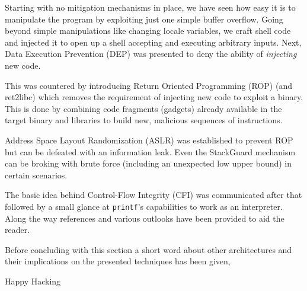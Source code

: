 \documentclass[article]{uibk}
\begin{document}
Starting with no mitigation mechanisms in place, we have seen how easy it is to
manipulate the program by exploiting just one simple buffer overflow. Going
beyond simple manipulations like changing locale variables, we craft shell code
and injected it to open up a shell accepting and executing arbitrary inputs.
Next, Data Execution Prevention (DEP) was presented to deny the ability of
\emph{injecting} new code.

This was countered by introducing Return Oriented Programming (ROP) (and
ret2libc) which removes the requirement of injecting new code to exploit a
binary. This is done by combining code fragments (gadgets) already available in
the target binary and libraries to build new, malicious sequences of
instructions.

Address Space Layout Randomization (ASLR) was established to prevent ROP but
can be defeated with an information leak. Even the StackGuard mechanism can be
broking with brute force (including an unexpected low upper bound) in certain
scenarios.

The basic idea behind Control-Flow Integrity (CFI) was communicated after that
followed by a small glance at \texttt{printf}'s capabilities to work as an
interpreter. Along the way references and various outlooks have been provided
to aid the reader.

Before concluding with this section a short word about other architectures and
their implications on the presented techniques has been given,

Happy Hacking

\newpage


\end{document}
